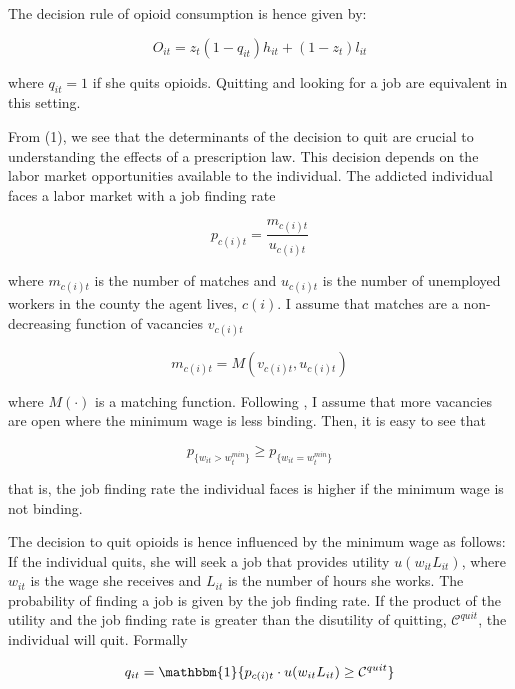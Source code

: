 \documentclass[12pt,a4paper]{article}
\begin{document}
The decision rule of opioid consumption is hence given by:

\begin{equation}
    O_{it} = z_{t}\left(1-q_{it}\right)h_{it} + (1-z_{t})l_{it}
\end{equation}

where \(q_{it} = 1\) if she quits opioids. 
Quitting and looking for a job are equivalent in this setting.

From (1), we see that the determinants of the decision to quit are crucial to understanding the effects of a prescription law.
This decision depends on the labor market opportunities available to the individual.
The addicted individual faces a labor market with a job finding rate

\begin{equation}
    p_{c(i)t} = \dfrac{m_{c(i)t}}{u_{c(i)t}}
\end{equation}

where \(m_{c(i)t}\) is the number of matches and \(u_{c(i)t}\) is the number of unemployed workers in the county the agent lives, \(c(i)\). 
I assume that matches are a non-decreasing function of vacancies \(v_{c(i)t}\)

\begin{equation}
    m_{c(i)t} = M(v_{c(i)t}, u_{c(i)t})
\end{equation}

where \(M\left(\cdot \right) \) is a matching function. 
Following \textcite{Flinn2010}, I assume that more vacancies are open where the minimum wage is less binding. 
Then, it is easy to see that

\begin{equation}
    p_{\{w_{it} > w^{min}_t\}} \geq p_{\{w_{it} = w^{min}_t\}}
\end{equation}

that is, the job finding rate the individual faces is higher if the minimum wage is not binding.

The decision to quit opioids is hence influenced by the minimum wage as follows:
If the individual quits, she will seek a job that provides utility \(u(w_{it}L_{it})\), where \(w_{it}\) is the wage she receives and \(L_{it}\) is the number of hours she works.
The probability of finding a job is given by the job finding rate.
If the product of the utility and the job finding rate is greater than the disutility of quitting, \(\mathcal{C}^{quit}\), the individual will quit.
Formally

\begin{equation}
    q_{it}  = \mathbbm{1}\{p_{{c(i)t}} \cdot u(w_{it}L_{it}) \geq \mathcal{C}^{quit}\}
\end{equation}
\end{document}
